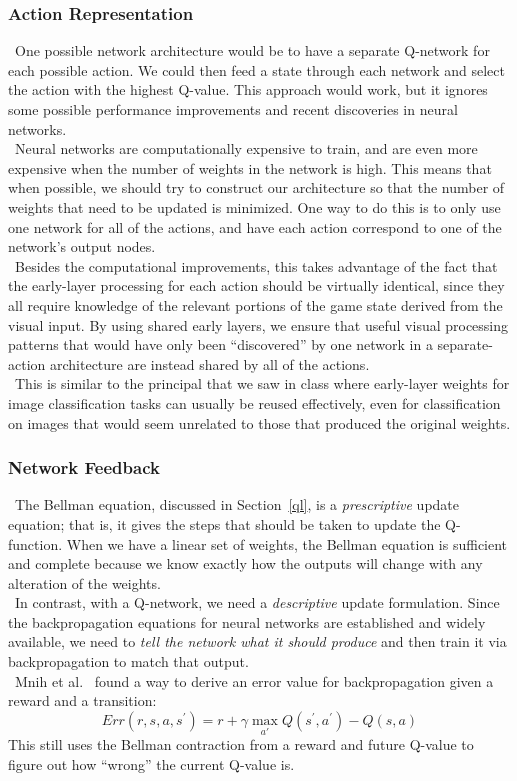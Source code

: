 \documentclass[conference]{IEEEtran}
\begin{document}
\subsubsection{Action Representation}
\noindent\ One possible network architecture would be to have a separate
Q-network for each possible action. We could then feed a state through each
network and select the action with the highest Q-value. This approach would
work, but it ignores some possible performance improvements and recent
discoveries in neural networks.\\
\indent\ Neural networks are computationally expensive to train, and are even more expensive
when the number of weights in the network is high. This means that when
possible, we should try to construct our architecture so that the number of weights that
need to be updated is minimized. One way to do this is to only use one network for all of
the actions, and have each action correspond to one of the network's output nodes.\\
\indent\ Besides the computational improvements, this takes advantage of the fact that
the early-layer processing for each action should be virtually identical, since they all
require knowledge of the relevant portions of the game state derived from the visual input.
By using shared early layers, we ensure that useful visual processing patterns that would
have only been ``discovered'' by one network in a separate-action architecture are instead
shared by all of the actions.\\
\indent\ This is similar to the principal that we saw in class where early-layer weights
for image classification tasks can usually be reused effectively, even for classification
on images that would seem unrelated to those that produced the original weights.

\subsubsection{Network Feedback}
\noindent\ The Bellman equation, discussed in Section~\ref{ql}, is a \emph{prescriptive}
update equation; that is, it gives the steps that should be taken to update the
Q-function. When we have a linear set of weights, the Bellman equation is sufficient and
complete because we know exactly how the outputs will change with any alteration of the
weights.\\
\indent\ In contrast, with a Q-network, we need a \emph{descriptive} update formulation.
Since the backpropagation equations for neural networks are established and widely
available, we need to \emph{tell the network what it should produce} and then train it
via backpropagation to match that output.\\
\indent\ Mnih et al.~\cite{mnih2013playing} found a way to derive an error value for
backpropagation given a reward and a transition:
\begin{equation}
    Err(r, s, a, s^{'})=r+\gamma\max_{a'}Q(s^{'},a^{'})-Q(s,a)
\end{equation}
This still uses the Bellman contraction from a reward and future Q-value to figure out
how ``wrong'' the current Q-value is.
\end{document}
